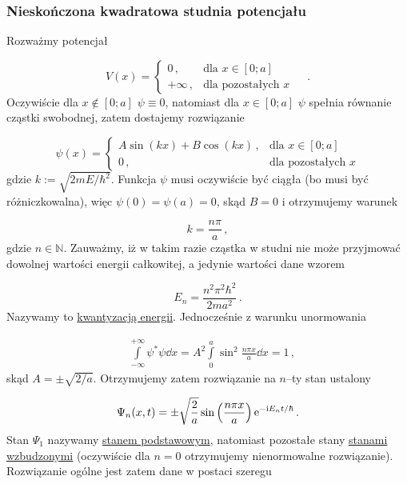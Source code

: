 \documentclass{myclass}
\begin{document}
\subsubsection{Nieskończona kwadratowa studnia potencjału}

Rozważmy potencjał

\begin{equation*}
    V(x)=\begin{cases}
    0\,,&\text{dla \(x\in[0;a]\)}\\
    +\infty\,,&\text{dla pozostałych \(x\)}
    \end{cases}\quad\,.
\end{equation*}
Oczywiście dla \(x\notin[0;a]\) \(\psi\equiv 0\), natomiast dla \(x\in[0;a]\) \(\psi\) spełnia
równanie cząstki swobodnej, zatem dostajemy rozwiązanie

\begin{equation*}
    \psi(x)=\begin{cases}
    A\sin(kx)+B\cos(kx)\,,&\text{dla \(x\in[0;a]\)}\\
    0\,,&\text{dla pozostałych \(x\)}
    \end{cases}
\end{equation*}
gdzie \(k:=\sqrt{2mE/\hbar^2}\). Funkcja \(\psi\) musi oczywiście być ciągła (bo musi być
różniczkowalna), więc \(\psi(0)=\psi(a)=0\), skąd \(B=0\) i otrzymujemy warunek

\begin{equation*}
    k=\frac{n\pi}{a}\,,
\end{equation*}
gdzie \(n\in\mathbb{N}\). Zauważmy, iż w takim razie cząstka w studni nie może przyjmować dowolnej
wartości energii całkowitej, a jedynie wartości dane wzorem

\begin{equation*}
    E_n=\frac{n^2\pi^2\hbar^2}{2ma^2}\,.
\end{equation*}
Nazywamy to \underline{kwantyzacją energii}. Jednocześnie z warunku unormowania

\begin{equation*}
\begin{split}
    &\int\limits_{-\infty}^{+\infty}\psi^*\psi\dd{x}=A^2\int\limits_{0}^{a}\sin^2\frac{n\pi x}{a}\dd{x}= 1\,, 
\end{split}
\end{equation*}
skąd \(A=\pm\sqrt{2/a}\). Otrzymujemy zatem rozwiązanie na \(n\)--ty stan ustalony

\begin{equation*}
    \Psi_n(x,t)=\pm\sqrt{\frac{2}{a}}\sin\left(\frac{n\pi x}{a}\right)\mathrm{e}^{-\mathrm{i} E_nt/\hbar}\,.
\end{equation*}
Stan \(\Psi_1\) nazywamy \underline{stanem podstawowym}, natomiast pozostałe stany
\underline{stanami wzbudzonymi} (oczywiście dla \(n=0\) otrzymujemy nienormowalne rozwiązanie).
Rozwiązanie ogólne jest zatem dane w postaci szeregu
\end{document}
